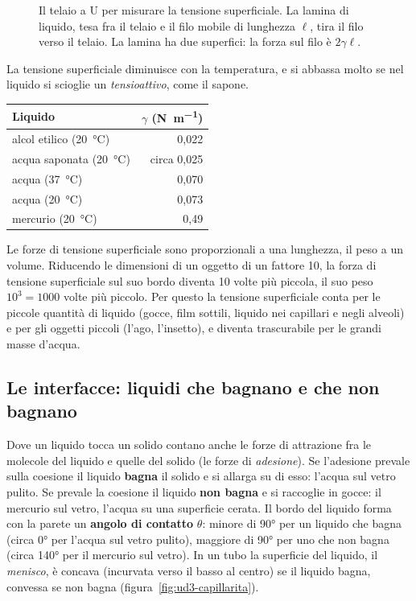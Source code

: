 \begin{figure}[h]
\centering

\caption{Il telaio a U per misurare la tensione superficiale. La lamina di liquido, tesa fra il telaio e il filo mobile di lunghezza $\ell$, tira il filo verso il telaio. La lamina ha due superfici: la forza sul filo è $2\gamma\ell$.}
\label{fig:ud3-telaio}
\end{figure}

La tensione superficiale diminuisce con la temperatura, e si abbassa molto se nel liquido si scioglie un \emph{tensioattivo}, come il sapone.

\begin{center}
\small
\begin{tabular}{@{}l r@{}}
\toprule
Liquido & $\gamma$ (\si{\newton\per\metre}) \\
\midrule
alcol etilico (\SI{20}{\celsius}) & 0,022 \\
acqua saponata (\SI{20}{\celsius}) & circa 0,025 \\
acqua (\SI{37}{\celsius}) & 0,070 \\
acqua (\SI{20}{\celsius}) & 0,073 \\
mercurio (\SI{20}{\celsius}) & 0,49 \\
\bottomrule
\end{tabular}
\end{center}

Le forze di tensione superficiale sono proporzionali a una lunghezza, il peso a un volume. Riducendo le dimensioni di un oggetto di un fattore 10, la forza di tensione superficiale sul suo bordo diventa 10 volte più piccola, il suo peso $10^3 = 1000$ volte più piccolo. Per questo la tensione superficiale conta per le piccole quantità di liquido (gocce, film sottili, liquido nei capillari e negli alveoli) e per gli oggetti piccoli (l'ago, l'insetto), e diventa trascurabile per le grandi masse d'acqua.

\subsection{Le interfacce: liquidi che bagnano e che non bagnano}

Dove un liquido tocca un solido contano anche le forze di attrazione fra le molecole del liquido e quelle del solido (le forze di \emph{adesione}). Se l'adesione prevale sulla coesione il liquido \textbf{bagna} il solido e si allarga su di esso: l'acqua sul vetro pulito. Se prevale la coesione il liquido \textbf{non bagna} e si raccoglie in gocce: il mercurio sul vetro, l'acqua su una superficie cerata. Il bordo del liquido forma con la parete un \textbf{angolo di contatto} $\theta$: minore di \ang{90} per un liquido che bagna (circa \ang{0} per l'acqua sul vetro pulito), maggiore di \ang{90} per uno che non bagna (circa \ang{140} per il mercurio sul vetro). In un tubo la superficie del liquido, il \emph{menisco}, è concava (incurvata verso il basso al centro) se il liquido bagna, convessa se non bagna (figura~\ref{fig:ud3-capillarita}).

